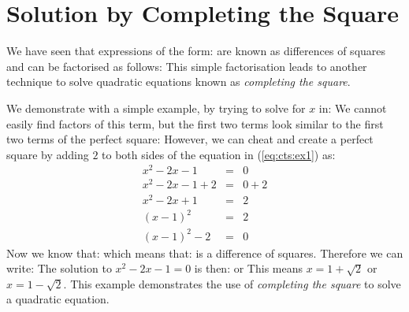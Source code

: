 \section{Solution by Completing the Square}

We have seen that expressions of the form:
are known as differences of squares and can be factorised as follows:
This simple factorisation leads to another technique to solve quadratic equations known as \textit{completing the square}.

We demonstrate with a simple example, by trying to solve for $x$ in:
We cannot easily find factors of this term, but the first two terms look similar to the first two terms of the perfect square:
However, we can cheat and create a perfect square by adding $2$ to both sides of the equation in (\ref{eq:cts:ex1}) as:
\begin{eqnarray*}
x^2-2x-1&=&0\\
x^2-2x-1+2&=&0+2\\
x^2-2x+1&=&2\\
(x-1)^2&=&2\\
(x-1)^2-2&=&0
\end{eqnarray*}
Now we know that:
which means that:
is a difference of squares.
Therefore we can write:
The solution to $x^2-2x-1=0$ is then:
or
This means $x=1+\sqrt{2}$ or $x=1-\sqrt{2}$. This example demonstrates the use of \textit{completing the square} to solve a quadratic equation.

